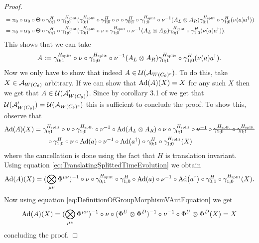 \documentclass[11pt,a4paper,twoside]{article}
\numberwithin{equation}{section}
\begin{document}
\begin{proof}
\begin{align}
			&=\pi_0\circ\alpha_0\circ\Theta\circ\gamma^H_{0;1}\circ\gamma^{\Hsplit}_{1;0}(\gamma^{\Hsplit}_{0;1}\circ\stkout{\gamma^H_{1;0}}\circ\nu\circ\stkout{\gamma^H_{0;1}}\circ\gamma^{\Hsplit}_{1;0}\circ\nu^{-1}(A_L\otimes A_R)\gamma^{\Hsplit}_{0;1}\circ\gamma^H_{1;0}(\nu(a)a^\dagger))\\
			\nonumber
			&=\pi_0\circ\alpha_0\circ\Theta\circ\gamma^H_{0;1}\circ\gamma^{\Hsplit}_{1;0}(\gamma^{\Hsplit}_{0;1}\circ\nu\circ\gamma^{\Hsplit}_{1;0}\circ\nu^{-1}(A_L\otimes A_R)\gamma^{\Hsplit}_{0;1}\circ\gamma^H_{1;0}(\nu(a)a^\dagger)).
		\end{align}
		This shows that we can take
		\begin{equation}
			A\defeq \gamma^{\Hsplit}_{0;1}\circ\nu\circ\gamma^{\Hsplit}_{1;0}\circ\nu^{-1}(A_L\otimes A_R)\gamma^{\Hsplit}_{0;1}\circ\gamma^H_{1;0}(\nu(a)a^\dagger).
		\end{equation}
		Now we only have to show that indeed $A\in\UU(\AA_{W(C_\theta)^c})$. To do this, take $X\in\AA_{W(C_\theta)}$ arbitrary. If we can show that $\Ad{A}(X)=X$ for any such $X$ then we get that $A\in\UU(\AA_{W(C_\theta)}')$. Since by corollary 3.1 of \cite{NaScWe_2013} we get that $\UU(\AA_{W(C_\theta)}')=\UU(\AA_{W(C_\theta)^c})$ this is sufficient to conclude the proof. To show this, observe that
		\begin{align}
			\Ad{A}(X)&=\gamma^{\Hsplit}_{0;1}\circ\nu\circ\gamma^{\Hsplit}_{1;0}\circ\nu^{-1}\circ\Ad{A_L\otimes A_R}\circ\nu\circ\gamma^{\Hsplit}_{0;1}\circ\stkout{\nu^{-1}}\circ\stkout{\gamma^{\Hsplit}_{1;0}\circ\gamma^{\Hsplit}_{0;1}}\\
			&\nonumber
			\qquad\circ\gamma^H_{1;0}\circ\stkout{\nu}\circ\Ad{a}\circ\nu^{-1}\circ\Ad{a^\dagger}\circ\gamma^H_{0;1}\circ\gamma^{\Hsplit}_{1;0}(X)
		\end{align}
		where the cancellation is done using the fact that $H$ is translation invariant. Using equation \eqref{eq:TranslatingSplittedTimeEvolution} we obtain
		\begin{equation}
			\Ad{A}(X)=(\bigotimes_{\mu\nu}\Phi^{\mu\nu})^{-1}\circ\nu\circ\gamma^{\Hsplit}_{0;1}\circ\gamma^H_{1;0}\circ\Ad{a}\circ\nu^{-1}\circ\Ad{a^\dagger}\circ\gamma^H_{0;1}\circ\gamma^{\Hsplit}_{1;0}(X).
		\end{equation}
		Now using equation \eqref{eq:DefinitionOfGroupMorphismVAutEquation} we get
		\begin{equation}
			\Ad{A}(X)=(\bigotimes_{\mu\nu}\Phi^{\mu\nu})^{-1}\circ\nu\circ(\Phi^U\otimes\Phi^D)^{-1}\circ\nu^{-1}\circ\Phi^U\otimes\Phi^D(X)=X
		\end{equation}
		concluding the proof.
	\end{proof}
\end{document}
